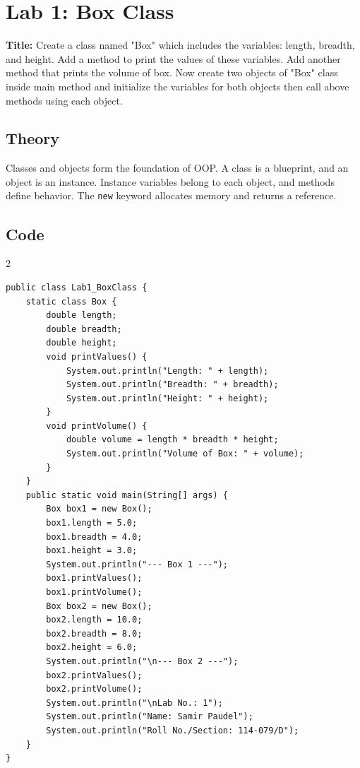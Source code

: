 \documentclass[10pt,a4paper]{article}
\begin{document}
\section*{Lab 1: Box Class}

\textbf{Title:} Create a class named "Box" which includes the variables: length, breadth, and height. Add a method to print the values of these variables. Add another method that prints the volume of box. Now create two objects of "Box" class inside main method and initialize the variables for both objects then call above methods using each object.

\subsection*{Theory}
Classes and objects form the foundation of OOP. A class is a blueprint, and an object is an instance. Instance variables belong to each object, and methods define behavior. The \texttt{new} keyword allocates memory and returns a reference.

\subsection*{Code}
\begin{multicols}{2}
\begin{lstlisting}
public class Lab1_BoxClass {
    static class Box {
        double length;
        double breadth;
        double height;
        void printValues() {
            System.out.println("Length: " + length);
            System.out.println("Breadth: " + breadth);
            System.out.println("Height: " + height);
        }
        void printVolume() {
            double volume = length * breadth * height;
            System.out.println("Volume of Box: " + volume);
        }
    }
    public static void main(String[] args) {
        Box box1 = new Box();
        box1.length = 5.0;
        box1.breadth = 4.0;
        box1.height = 3.0;
        System.out.println("--- Box 1 ---");
        box1.printValues();
        box1.printVolume();
        Box box2 = new Box();
        box2.length = 10.0;
        box2.breadth = 8.0;
        box2.height = 6.0;
        System.out.println("\n--- Box 2 ---");
        box2.printValues();
        box2.printVolume();
        System.out.println("\nLab No.: 1");
        System.out.println("Name: Samir Paudel");
        System.out.println("Roll No./Section: 114-079/D");
    }
}
\end{lstlisting}
\end{multicols}
\end{document}
